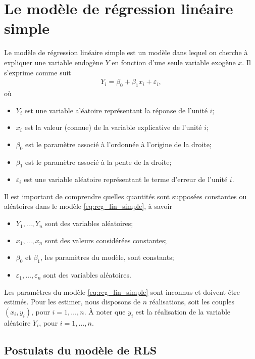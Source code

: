\section{Le modèle de régression linéaire simple}
\label{sec:ModèleRLS}

Le modèle de régression linéaire simple est un modèle dans lequel on cherche à expliquer une variable endogène $Y$ en fonction d'une seule variable exogène $x$. Il s'exprime comme suit
\begin{eqnarray}
 Y_i = \beta_0 + \beta_1 x_i + \varepsilon_i, 
 \label{eq:reg_lin_simple}
\end{eqnarray}
où 
\begin{itemize}
    \item $Y_i$ est une variable aléatoire représentant la réponse de l'unité $i$;
    \item $x_i$ est la valeur (connue) de la variable explicative de l'unité $i$;
    \item $\beta_0$ est le paramètre associé à l'ordonnée à l'origine de la droite;
    \item $\beta_1$ est le paramètre associé à la pente de la droite;
    \item $\varepsilon_i$ est une variable aléatoire représentant le terme d'erreur de l'unité $i$.
\end{itemize}
Il est important de comprendre quelles quantités sont supposées constantes ou aléatoires dans le modèle \eqref{eq:reg_lin_simple}, à savoir
 \begin{itemize}
 \item $Y_1,\ldots, Y_n$ sont des variables aléatoires;
 \item $x_1,\ldots,x_n$ sont des valeurs considérées constantes;
 \item $\beta_0$ et $\beta_1$, les paramètres du modèle, sont constants;
 \item $\varepsilon_1,\ldots,\varepsilon_n$ sont des variables aléatoires.
  \end{itemize}
Les paramètres du modèle \eqref{eq:reg_lin_simple} sont inconnus et doivent être estimés. Pour les estimer, nous disposons de $n$ réalisations, soit les couples $(x_i, y_i)$, pour $i=1, \dots, n$. À noter que $y_i$ est la réalisation de la variable aléatoire $Y_i$, pour $i = 1, \dots, n$.


\subsection{Postulats du modèle de RLS}
\label{sec:Postulats}

